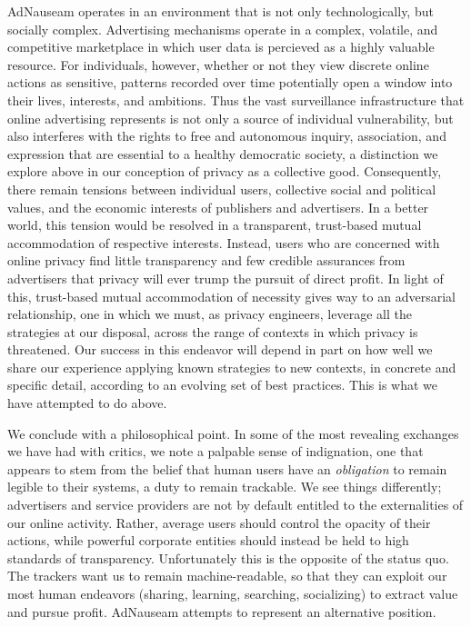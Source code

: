 \documentclass[conference]{IEEEtran}
\begin{document}
AdNauseam operates in an environment that is not only technologically, but socially complex. Advertising mechanisms operate in a complex, volatile, and competitive marketplace in which user data is percieved as a highly valuable resource. For individuals, however, whether or not they view discrete online actions as sensitive, patterns recorded over time potentially open a window into their lives, interests, and ambitions. Thus the vast surveillance infrastructure that online advertising represents is not only a source of individual vulnerability, but also interferes with the rights to free and autonomous inquiry, association, and expression that are essential to a healthy democratic society, a distinction we explore above in our conception of privacy as a collective good. Consequently, there remain tensions between individual users, collective social and political values, and the economic interests of publishers and advertisers. In a better world, this tension would be resolved in a transparent, trust-based mutual accommodation of respective interests. Instead, users who are concerned with online privacy find little transparency and few credible assurances from advertisers that privacy will ever trump the pursuit of direct profit. In light of this, trust-based mutual accommodation of necessity gives way to an adversarial relationship, one in which we must, as privacy engineers, leverage all the strategies at our disposal, across the range of contexts in which privacy is threatened. Our success in this endeavor will depend in part on how well we share our experience applying known strategies to new contexts, in concrete and specific detail, according to an evolving set of best practices. This is what we have attempted to do above.

We conclude with a philosophical point.
In some of the most revealing exchanges we have had with critics, we note a palpable sense of indignation, one that appears to stem from the belief that human users have an \emph{obligation} to remain legible to their systems, a duty to remain trackable. We see things differently; advertisers and service providers are not by default entitled to the externalities of our online activity. Rather, average users should control the opacity of their actions, while powerful corporate entities should instead be held to high standards of transparency. Unfortunately this is the opposite of the status quo. The trackers want us to remain machine-readable, so that they can exploit our most human endeavors (sharing, learning, searching, socializing) to extract value and pursue profit. AdNauseam attempts to represent an alternative position.
\end{document}
